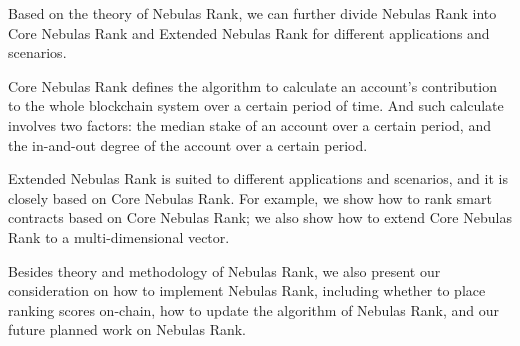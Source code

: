 Based on the theory of Nebulas Rank, we can further divide Nebulas Rank into Core Nebulas
Rank and Extended Nebulas Rank for different applications and scenarios.

Core Nebulas Rank defines the algorithm to calculate an account's contribution
to the whole blockchain system over a certain period of time. And such
calculate involves two factors: the median stake of an account over a certain
period, and the in-and-out degree of the account over a certain period.

Extended Nebulas Rank is suited to different applications and scenarios,
and it is closely based on Core Nebulas Rank. For example, we show how to rank smart
contracts based on Core Nebulas Rank; we also show how to extend Core Nebulas Rank to a multi-dimensional vector.


Besides theory and methodology of Nebulas Rank, we also present our
consideration on how to implement Nebulas Rank, including whether to
place ranking scores on-chain, how to update the algorithm of Nebulas Rank,
and our future planned work on Nebulas Rank.

